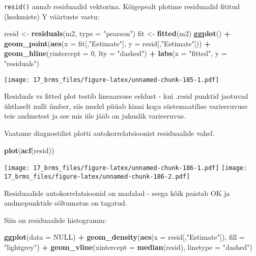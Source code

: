 \documentclass[]{article}
\newenvironment{Shaded}{\begin{snugshade}}{\end{snugshade}}
\newcommand{\KeywordTok}[1]{\textcolor[rgb]{0.13,0.29,0.53}{\textbf{#1}}}
\newcommand{\DataTypeTok}[1]{\textcolor[rgb]{0.13,0.29,0.53}{#1}}
\newcommand{\DecValTok}[1]{\textcolor[rgb]{0.00,0.00,0.81}{#1}}
\newcommand{\StringTok}[1]{\textcolor[rgb]{0.31,0.60,0.02}{#1}}
\newcommand{\OtherTok}[1]{\textcolor[rgb]{0.56,0.35,0.01}{#1}}
\newcommand{\OperatorTok}[1]{\textcolor[rgb]{0.81,0.36,0.00}{\textbf{#1}}}
\newcommand{\NormalTok}[1]{#1}
\begin{document}
\texttt{resid()} annab residuaalid vektorina. Kõigepealt plotime
residuaalid fititud (keskmiste) Y väärtuste vastu:

\begin{Shaded}
\begin{Highlighting}[]
\NormalTok{resid <-}\StringTok{ }\KeywordTok{residuals}\NormalTok{(m2, }\DataTypeTok{type =} \StringTok{"pearson"}\NormalTok{)}
\NormalTok{fit <-}\StringTok{ }\KeywordTok{fitted}\NormalTok{(m2)}
\KeywordTok{ggplot}\NormalTok{() }\OperatorTok{+}\StringTok{ }
\StringTok{  }\KeywordTok{geom_point}\NormalTok{(}\KeywordTok{aes}\NormalTok{(}\DataTypeTok{x =}\NormalTok{ fit[,}\StringTok{"Estimate"}\NormalTok{], }\DataTypeTok{y =}\NormalTok{ resid[,}\StringTok{"Estimate"}\NormalTok{])) }\OperatorTok{+}\StringTok{ }
\StringTok{  }\KeywordTok{geom_hline}\NormalTok{(}\DataTypeTok{yintercept =} \DecValTok{0}\NormalTok{, }\DataTypeTok{lty =} \StringTok{"dashed"}\NormalTok{) }\OperatorTok{+}
\StringTok{  }\KeywordTok{labs}\NormalTok{(}\DataTypeTok{x =} \StringTok{"fitted"}\NormalTok{, }\DataTypeTok{y =} \StringTok{"residuals"}\NormalTok{)}
\end{Highlighting}
\end{Shaded}

\texttt{[image: 17\_brms\_files/figure-latex/unnamed-chunk-185-1.pdf]}

Residuals vs fitted plot testib lineaarsuse eeldust - kui .resid punktid
jaotuvad ühtlaselt nulli ümber, siis mudel püüab kinni kogu
süstemaatilise varieeruvuse teie andmetest ja see mis üle jääb on
juhuslik varieeruvus.

Vaatame diagnostilist plotti autokorrelatsioonist residuaalide vahel.

\begin{Shaded}
\begin{Highlighting}[]
\KeywordTok{plot}\NormalTok{(}\KeywordTok{acf}\NormalTok{(resid))}
\end{Highlighting}
\end{Shaded}

\texttt{[image: 17\_brms\_files/figure-latex/unnamed-chunk-186-1.pdf]}
\texttt{[image: 17\_brms\_files/figure-latex/unnamed-chunk-186-2.pdf]}

Residuaalide autokorrelatsioonid on madalad - seega kõik paistab OK ja
andmepunktide sõltumatus on tagatud.

Siin on residuaalide histogramm:

\begin{Shaded}
\begin{Highlighting}[]
\KeywordTok{ggplot}\NormalTok{(}\DataTypeTok{data =} \OtherTok{NULL}\NormalTok{) }\OperatorTok{+}\StringTok{ }
\StringTok{  }\KeywordTok{geom_density}\NormalTok{(}\KeywordTok{aes}\NormalTok{(}\DataTypeTok{x =}\NormalTok{ resid[,}\StringTok{"Estimate"}\NormalTok{]), }\DataTypeTok{fill =} \StringTok{"lightgrey"}\NormalTok{) }\OperatorTok{+}\StringTok{ }
\StringTok{  }\KeywordTok{geom_vline}\NormalTok{(}\DataTypeTok{xintercept =} \KeywordTok{median}\NormalTok{(resid), }\DataTypeTok{linetype =} \StringTok{"dashed"}\NormalTok{)}
\end{Highlighting}
\end{Shaded}
\end{document}

